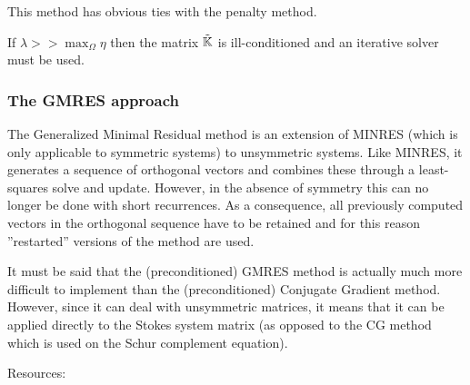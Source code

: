 \begin{remark} 
This method has obvious ties with the penalty method. 
\end{remark}

\begin{remark} 
If $\lambda >> \max_\Omega{\eta}$ then the matrix $\tilde{{\mathbb{K}}}$ is ill-conditioned and an iterative solver must be used.
\end{remark}




\subsubsection{The GMRES approach}

The Generalized Minimal Residual method \cite{sasc86} 
is an extension of MINRES (which is only applicable to symmetric systems) to unsymmetric systems. 
Like MINRES, it generates a sequence of orthogonal vectors and 
combines these through a least-squares solve and update. However, 
in the absence of symmetry this can no longer be done with short recurrences. As a consequence, 
all previously computed vectors in the orthogonal sequence have to be retained and 
for this reason ''restarted'' versions of the method are used.

It must be said that the (preconditioned) GMRES method is actually much more difficult to implement 
than the (preconditioned) Conjugate Gradient method.
However, since it can deal with unsymmetric matrices, it means that it can be applied 
directly to the Stokes system matrix (as opposed to the CG method which is used on the Schur complement
equation).

 

Resources: \cite[p208]{eijkhout} \cite{saad} \cite{babc94}







 













